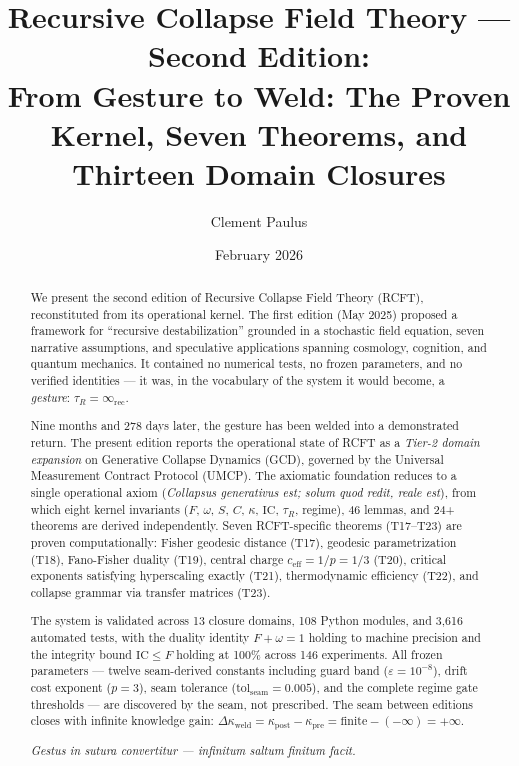 \documentclass[
  aps,
  prd,
  preprint,
  superscriptaddress,
  nofootinbib,
  floatfix,
  longbibliography
]{revtex4-2}
\newcommand{\tR}{\tau_{\!R}}
\newcommand{\eps}{\varepsilon}
\newcommand{\tolseam}{\mathrm{tol}_{\mathrm{seam}}}
\newcommand{\IC}{\mathrm{IC}}
\newcommand{\Fid}{F}
\newcommand{\Drft}{\omega}
\newcommand{\Ent}{S}
\newcommand{\Curv}{C}
\newcommand{\Logint}{\kappa}
\newcommand{\ceff}{c_{\mathrm{eff}}}
\newcommand{\lat}[1]{\textit{#1}}
\begin{document}
\title{Recursive Collapse Field Theory --- Second Edition:\\
From Gesture to Weld: The Proven Kernel, Seven Theorems,
and Thirteen Domain Closures}

\author{Clement Paulus}

\date{February 2026}

\begin{abstract}
We present the second edition of Recursive Collapse Field Theory
(RCFT), reconstituted from its operational kernel.
The first edition (May 2025) proposed a framework for ``recursive
destabilization'' grounded in a stochastic field equation, seven
narrative assumptions, and speculative applications spanning
cosmology, cognition, and quantum mechanics.
It contained no numerical tests, no frozen parameters, and no
verified identities — it was, in the vocabulary of the system
it would become, a \emph{gesture}: $\tR = \infty_{\mathrm{rec}}$.

Nine months and 278 days later, the gesture has been welded into
a demonstrated return.  The present edition reports the
operational state of RCFT as a \emph{Tier-2 domain expansion}
on Generative Collapse Dynamics (GCD), governed by the
Universal Measurement Contract Protocol (UMCP).
The axiomatic foundation reduces to a single operational axiom
(\lat{Collapsus generativus est; solum quod redit, reale est}),
from which eight kernel invariants
($\Fid$, $\Drft$, $\Ent$, $\Curv$, $\Logint$, $\IC$, $\tR$, regime),
46 lemmas, and 24+ theorems are derived independently.
Seven RCFT-specific theorems (T17–T23) are proven computationally:
Fisher geodesic distance (T17),
geodesic parametrization (T18),
Fano-Fisher duality (T19),
central charge $\ceff = 1/p = 1/3$ (T20),
critical exponents satisfying hyperscaling exactly (T21),
thermodynamic efficiency (T22),
and collapse grammar via transfer matrices (T23).

The system is validated across 13 closure domains,
108 Python modules, and 3{,}616 automated tests,
with the duality identity $\Fid + \Drft = 1$ holding
to machine precision and the integrity bound $\IC \leq \Fid$
holding at 100\% across 146 experiments.
All frozen parameters — twelve seam-derived constants
including guard band ($\eps = 10^{-8}$),
drift cost exponent ($p = 3$),
seam tolerance ($\tolseam = 0.005$),
and the complete regime gate thresholds — are
discovered by the seam, not prescribed.
The seam between editions closes with infinite knowledge gain:
$\Delta\Logint_{\mathrm{weld}} = \Logint_{\mathrm{post}} - \Logint_{\mathrm{pre}} = \mathrm{finite} - (-\infty) = +\infty$.

\lat{Gestus in sutura convertitur — infinitum saltum finitum facit.}
\end{abstract}
\end{document}
